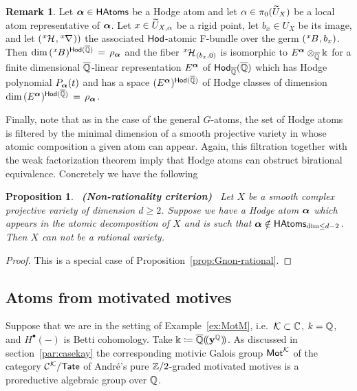 \documentclass[twoside,leqno]{article}
\numberwithin{equation}{section}
\theoremstyle{plain}
\newtheorem{proposition}[equation]{Proposition}
\theoremstyle{definition}
\newtheorem{remark}[equation]{Remark}
\begin{document}
\begin{remark} \label{rem:atomicFhodgefiber}     
Let $\boldsymbol{\alpha} \in \mathsf{HAtoms}$ be a Hodge atom and let $\alpha \in \pi_{0}(\widetilde U_{X})$ be a local atom representative of $\boldsymbol{\alpha}$. Let $x \in \widetilde U_{X,\alpha}$ be a rigid point, let $b_{x} \in U_{X}$ be its image, and let $\left(\tensor[^x]{\cH}{},\tensor[^x]{\nabla}{})\right)$   the associated $\mathsf{Hod}$-atomic F-bundle over the germ $(\tensor[^x]{B}{},b_{x})$. Then $\dim \, (\tensor[^x]{B}{})^{\hodge(\overline{\bbQ})} \, = \, \rho_{\balpha}$ and the fiber $\tensor[^x]{\cH}{}_{(b_{x},0)}$ is isomorphic to $E^{\boldsymbol{\alpha}}\otimes_{\overline{\mathbb Q}} \Bbbk$ for a finite dimensional $\overline{\mathbb Q}$-linear representation  $E^{\boldsymbol{\alpha}}$ of $\mathsf{Hod}_{\overline{\mathbb Q}}(\overline{\mathbb Q})$  which has  Hodge polynomial $P_{\boldsymbol{\alpha}}(t)$ and has a space $(E^{\boldsymbol{\alpha}})^{\mathsf{Hod}(\overline{\mathbb Q})}$ of Hodge classes of dimension $\dim \, (E^{\boldsymbol{\alpha}})^{\mathsf{Hod}(\overline{\mathbb Q})} \, = \, \rho_{\boldsymbol{\alpha}}$.
\end{remark}

\medskip


Finally, note that as in the case of the general $G$-atoms, the set of Hodge atoms is filtered by the minimal dimension of a smooth projective variety in whose atomic composition a given atom can appear. Again, this filtration together with the weak factorization theorem \cite{Wlodarczyk_factorization,Abramovich_Torification_and_factorization} imply that Hodge atoms can obstruct birational equivalence. Concretely we have the following

\begin{proposition} \ {\bfseries (Non-rationality criterion) } \ \label{prop:non-rational}
Let $X$ be a smooth complex projective variety of dimension $d \geq 2$. Suppose we have a Hodge atom $\boldsymbol{\alpha}$ which appears in the atomic decomposition of $X$ and is such that $\boldsymbol{\alpha} \notin \mathsf{HAtoms}_{\dim \leq d-2}$. Then $X$ can not be a rational variety.
\end{proposition}
\begin{proof} This is a special case of Proposition~\ref{prop:Gnon-rational}.
\end{proof}

\subsection{Atoms from motivated motives} \label{subsec:motM.atoms}

Suppose that we are in the setting of Example~\ref{ex:MotM}, i.e.\  $\mathcal K \subset \mathbb C$, $k = \mathbb Q$, and $H^{\bullet}(-)$ is Betti cohomology. Take $\Bbbk \coloneqq \overline{\mathbb Q}(\!(\mathbf{y}^{\mathbb Q})\!)$. As discussed in section~\ref{par:casekay} the corresponding motivic  Galois group $\mathsf{Mot}^{\mathcal K}$ of the category $\mathcal{C}^{\mathcal K}/\mathsf{Tate}$ of Andr\'{e}'s pure $\mathbb Z/2$-graded motivated motives is a proreductive algebraic group over $\mathbb Q$.
\end{document}
